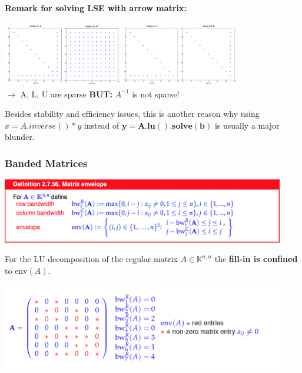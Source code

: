 \documentclass[12pt, a4paper]{article}
\newcommand{\K}{\mathbb{K}}
\begin{document}
\begin{tcolorbox}
	\vspace{1mm}
	\textbf{Remark for solving LSE with arrow matrix:}
	\begin{center}
		\includegraphics[width=0.8\textwidth]{arrow_matrix_inverse.png} \\
		$\rightarrow$ A, L, U are sparse \quad \quad \textbf{BUT:} $A^{-1}$ is not sparse! \\
	\end{center}

	Besides stability and efficiency issues, this is another reason why using \color{red} \\
	$x = A.inverse()*y$ \color{black} instead of \color{blue}$\mathbf{y=A.lu().solve(b)}$ \color{black} is usually a major blunder. 
\end{tcolorbox}


\subsubsection{Banded Matrices}

\begin{center}
	\includegraphics[width=350pt]{envelope}
\end{center}

For the LU-decomposition of the regular matrix $A \in \K^{n,n}$ the \textbf{fill-in is confined} to $\text{env}(A)$.

\begin{center}
	\includegraphics[width=350pt]{envelope2.png}
\end{center}
\end{document}
